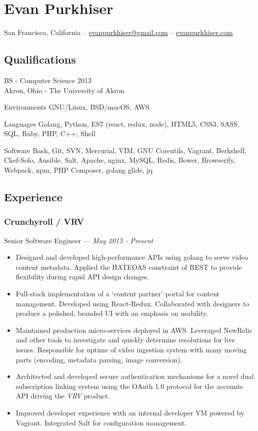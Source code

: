 \documentclass[letterpaper,10pt]{article}
\begin{document}
\section{Evan Purkhiser}

\hfill San Francisco, California --
\href{mailto:evanpurkhiser@gmail.com}{evanpurkhiser@gmail.com} --
\href{https://evanpurkhiser.com}{evanpurkhiser.com}

\subsection{Qualifications}

BS - Computer Science 2013\\
Akron, Ohio - The University of Akron

\begin{skills}
\item[Environments]
  GNU/Linux, BSD/macOS, AWS
\item[Languages]
  Golang, Python, ES7 (react, redux, node), HTML5, CSS3, SASS, SQL,
  Ruby, PHP, C++, Shell
\item[Software]
  Bash, Git, SVN, Mercurial, VIM, GNU Coreutils, Vagrant, Berkshelf,
  Chef-Solo, Ansible, Salt, Apache, nginx, MySQL, Redis, Bower, Browserify,
  Webpack, npm, PHP Composer, golang glide, jq
\end{skills}

\subsection{Experience}

\subsubsection{Crunchyroll / VRV}
\hfill Senior Software Engineer --- \emph{May 2015 - Present}

\begin{itemize}
\tightlist{}
\item
  Designed and developed high-performance APIs using golang to serve video
  content metadata. Applied the HATEOAS constraint of REST to provide
  flexibility during rapid API design changes.
\item
  Full-stack implementation of a `content partner' portal for content
  management. Developed using React-Redux. Collaborated with designers to
  produce a polished, branded UI with an emphasis on usability.
\item
  Maintained production micro-services deployed in AWS\@. Leveraged NewRelic and
  other tools to investigate and quickly determine resolutions for live
  issues. Responsible for uptime of video ingestion system with many moving
  parts (encoding, metadata parsing, image conversion).
\item
  Architected and developed secure authentication mechanisms for a novel dual
  subscription linking system using the OAuth 1.0 protocol for the accounts
  API driving the \emph{VRV} product.
\item
  Improved developer experience with an internal developer VM powered by
  Vagrant. Integrated Salt for configuration management.
\end{itemize}
\end{document}
